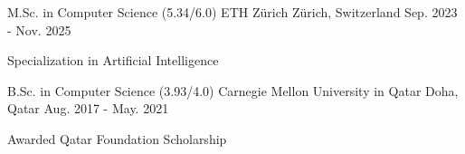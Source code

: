 

\begin{cventries}

\cventry
{M.Sc. in Computer Science (5.34/6.0)} %
{ETH Zürich} %
{Zürich, Switzerland} %
{Sep. 2023 - Nov. 2025} %
{
  \begin{cvitems} %
    \item {Specialization in Artificial Intelligence}
  \end{cvitems}
}

\cventry
{B.Sc. in Computer Science (3.93/4.0)} %
{Carnegie Mellon University in Qatar} %
{Doha, Qatar} %
{Aug. 2017 - May. 2021} %
{
  \begin{cvitems} %
    \item {Awarded Qatar Foundation Scholarship}
  \end{cvitems}
}

\end{cventries}
